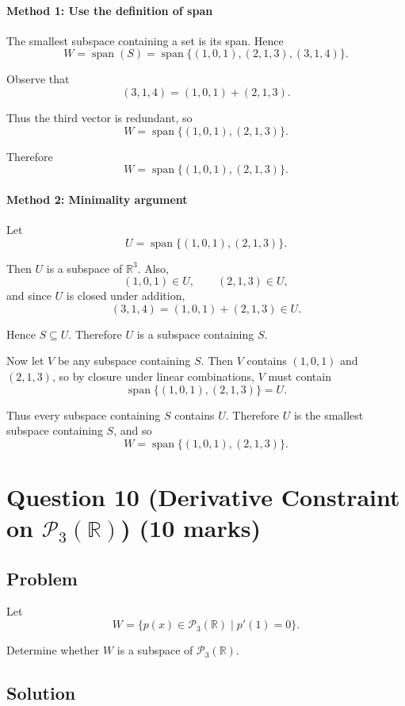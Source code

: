\documentclass[12pt]{article}
\newcommand{\Span}{\operatorname{span}}
\begin{document}
\paragraph{Method 1: Use the definition of span}

The smallest subspace containing a set is its span. Hence
\[
W=\Span(S)=\Span\{(1,0,1),(2,1,3),(3,1,4)\}.
\]

Observe that
\[
(3,1,4)=(1,0,1)+(2,1,3).
\]

Thus the third vector is redundant, so
\[
W=\Span\{(1,0,1),(2,1,3)\}.
\]

Therefore
\[
\boxed{W=\Span\{(1,0,1),(2,1,3)\}}.
\]

\paragraph{Method 2: Minimality argument}

Let
\[
U=\Span\{(1,0,1),(2,1,3)\}.
\]

Then \(U\) is a subspace of \(\mathbb R^3\). Also,
\[
(1,0,1)\in U,\qquad (2,1,3)\in U,
\]
and since \(U\) is closed under addition,
\[
(3,1,4)=(1,0,1)+(2,1,3)\in U.
\]

Hence \(S\subseteq U\). Therefore \(U\) is a subspace containing \(S\).

Now let \(V\) be any subspace containing \(S\). Then \(V\) contains \((1,0,1)\) and \((2,1,3)\), so by closure under linear combinations, \(V\) must contain
\[
\Span\{(1,0,1),(2,1,3)\}=U.
\]

Thus every subspace containing \(S\) contains \(U\). Therefore \(U\) is the smallest subspace containing \(S\), and so
\[
\boxed{W=\Span\{(1,0,1),(2,1,3)\}}.
\]

\newpage
\section{Question 10 (Derivative Constraint on \(\mathcal P_3(\mathbb R)\)) \hfill (10 marks)}
\subsection{Problem}

Let
\[
W=\{p(x)\in\mathcal P_3(\mathbb R)\mid p'(1)=0\}.
\]

Determine whether \(W\) is a subspace of \(\mathcal P_3(\mathbb R)\).

\subsection{Solution}
\end{document}
